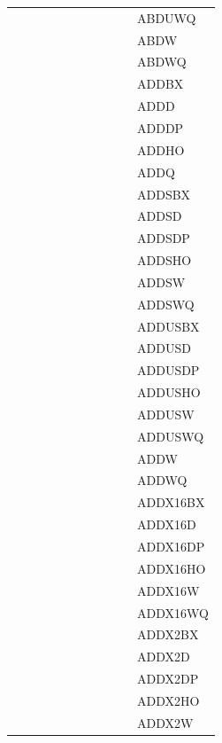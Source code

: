 {\begin{tabular}{|l|l|l|l|l|l|l|l|l|l|l|}
 & & & & & & & & & & \textsf{ABDUWQ} \\
 & & & & & & & & & & \textsf{ABDW} \\
 & & & & & & & & & & \textsf{ABDWQ} \\
 & & & & & & & & & & \textsf{ADDBX} \\
 & & & & & & & & & & \textsf{ADDD} \\
 & & & & & & & & & & \textsf{ADDDP} \\
 & & & & & & & & & & \textsf{ADDHO} \\
 & & & & & & & & & & \textsf{ADDQ} \\
 & & & & & & & & & & \textsf{ADDSBX} \\
 & & & & & & & & & & \textsf{ADDSD} \\
 & & & & & & & & & & \textsf{ADDSDP} \\
 & & & & & & & & & & \textsf{ADDSHO} \\
 & & & & & & & & & & \textsf{ADDSW} \\
 & & & & & & & & & & \textsf{ADDSWQ} \\
 & & & & & & & & & & \textsf{ADDUSBX} \\
 & & & & & & & & & & \textsf{ADDUSD} \\
 & & & & & & & & & & \textsf{ADDUSDP} \\
 & & & & & & & & & & \textsf{ADDUSHO} \\
 & & & & & & & & & & \textsf{ADDUSW} \\
 & & & & & & & & & & \textsf{ADDUSWQ} \\
 & & & & & & & & & & \textsf{ADDW} \\
 & & & & & & & & & & \textsf{ADDWQ} \\
 & & & & & & & & & & \textsf{ADDX16BX} \\
 & & & & & & & & & & \textsf{ADDX16D} \\
 & & & & & & & & & & \textsf{ADDX16DP} \\
 & & & & & & & & & & \textsf{ADDX16HO} \\
 & & & & & & & & & & \textsf{ADDX16W} \\
 & & & & & & & & & & \textsf{ADDX16WQ} \\
 & & & & & & & & & & \textsf{ADDX2BX} \\
 & & & & & & & & & & \textsf{ADDX2D} \\
 & & & & & & & & & & \textsf{ADDX2DP} \\
 & & & & & & & & & & \textsf{ADDX2HO} \\
 & & & & & & & & & & \textsf{ADDX2W} \\

\end{tabular}}
